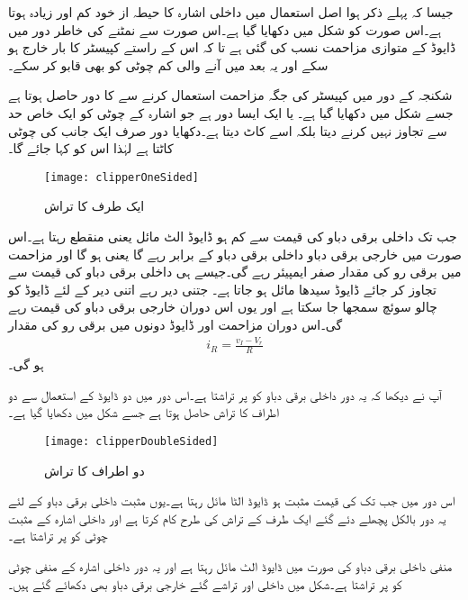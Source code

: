 جیسا کہ پہلے ذکر ہوا اصل استعمال میں داخلی اشارہ کا حیطہ از خود کم اور زیادہ ہوتا ہے۔اس صورت کو شکل میں دکھایا گیا ہے۔اس صورت سے نمٹنے کی خاطر دور میں ڈایوڈ کے متوازی مزاحمت  نسب کی گئی ہے تا کہ اس کے راستے کپیسٹر کا بار خارج ہو سکے اور یہ بعد میں آنے والی کم چوٹی کو بھی قابو کر سکے۔



شکنجہ کے دور میں کپیسٹر کی جگہ مزاحمت استعمال کرنے سے   کا دور حاصل ہوتا ہے جسے شکل  میں دکھایا گیا ہے۔ یا  ایک ایسا دور ہے جو اشارہ کے چوٹی کو ایک خاص حد سے تجاوز نہیں کرنے دیتا بلکہ اسے کاٹ دیتا ہے۔دکھایا دور صرف ایک جانب کی چوٹی کاٹتا ہے لہٰذا اس کو  کہا جائے گا۔
 \begin{figure}
\centering
\texttt{[image: clipperOneSided]}
\caption{ایک طرف کا تراش}
\label{شکل_ایک_طرف_کا_تراش}
\end{figure}
جب تک داخلی برقی دباو کی قیمت  سے کم ہو ڈایوڈ الٹ مائل یعنی منقطع رہتا ہے۔اس صورت میں خارجی برقی دباو داخلی برقی دباو کے برابر رہے گا یعنی ہو گا اور مزاحمت   میں برقی رو کی مقدار صفر ایمپیئر رہے گی۔جیسے ہی داخلی برقی دباو  کی قیمت  سے تجاوز کر جائے ڈایوڈ سیدھا مائل ہو جاتا ہے۔ جتنی دیر   رہے اتنی دیر کے لئے  ڈایوڈ کو چالو سوئچ سمجھا جا سکتا ہے اور یوں اس دوران خارجی برقی دباو کی قیمت  رہے گی۔اس دوران مزاحمت اور ڈایوڈ دونوں میں برقی رو کی مقدار
\begin{align*}
i_R=\frac{v_I-V_r}{R}
\end{align*}
ہو گی۔

آپ نے دیکھا کہ یہ دور داخلی برقی دباو کو  پر تراشتا ہے۔اس دور میں دو ڈایوڈ کے استعمال سے دو اطراف کا تراش حاصل ہوتا ہے جسے شکل   میں دکھایا گیا ہے۔
\begin{figure}
\centering
\texttt{[image: clipperDoubleSided]}
\caption{دو اطراف کا تراش}
\label{شکل_دو_اطراف_کا_تراش}
\end{figure}
اس دور میں جب تک  کی قیمت مثبت ہو ڈایوڈ  الٹا مائل رہتا ہے۔یوں مثبت داخلی برقی دباو کے لئے یہ دور بالکل پچھلے دئے گئے ایک طرف کے تراش کی طرح کام کرتا ہے اور داخلی اشارہ کے مثبت چوٹی کو  پر تراشتا ہے۔

منفی داخلی برقی دباو کی صورت میں ڈایوڈ  الٹ مائل رہتا ہے اور یہ دور داخلی اشارہ کے منفی چوٹی کو  پر تراشتا ہے۔شکل میں داخلی اور تراشے گئے خارجی برقی دباو بھی دکھائے گئے ہیں۔

